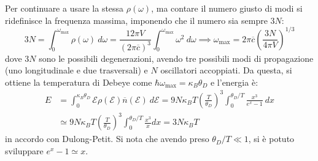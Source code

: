 \documentclass[10pt, a4paper]{scrartcl}
\numberwithin{equation}{subsection}
\theoremstyle{style1}
\theoremstyle{style2}
\begin{document}
Per continuare a usare la stessa $\rho (\omega)$, ma contare il numero giusto di modi si ridefinisce la frequenza massima, imponendo che il numero sia sempre $3N$:
\begin{equation}
	3N = \int_{0} ^{\omega_\text{max}}  \rho (\omega) \ d\omega= \frac{12 \pi V}{(2\pi \overline{c})^3}\int_{0} ^{\omega_\text{max}} \omega^2 \ d\omega  \implies \omega_\text{max}=2\pi \overline{c} \left(\frac{3N}{4\pi V}\right) ^{ 1/3} 
\end{equation}
dove $3N$ sono le possibili degenerazioni, avendo tre possibili modi di propagazione (uno longitudinale e due trasversali) e $N$ oscillatori accoppiati. Da questa, si ottiene la temperatura di Debeye come $\hbar \omega_\text{max} = \kappa _B \theta _D$ e l'energia \`e:
\begin{equation}
	\begin{split}
		E &= \int_{0} ^{\kappa _B \theta _D} \mathscr{E} \rho (\mathscr{E}) \overline{n}(\mathscr{E}) \ d\mathscr{E} = 9 N\kappa _B T \left(\frac{T}{\theta _D}\right) ^3 \int_{0} ^{\theta _D / T} \frac{x^3}{e^x - 1} \ dx \\
		  &\simeq 9 N\kappa _B T \left(\frac{T}{\theta _D}\right) ^3 \int_{0} ^{\theta _D / T} \frac{x^3}{x}dx=3N\kappa _B T
	\end{split}
\end{equation}
in accordo con Dulong-Petit. Si nota che avendo preso $\theta _D / T \ll 1$, si \`e potuto sviluppare $e^x -1 \simeq x$.
\end{document}
